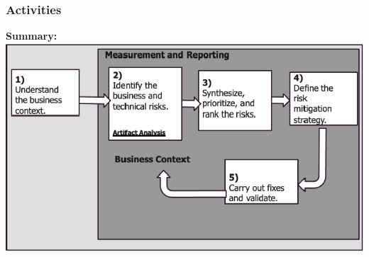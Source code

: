 \subsubsection{Activities}
\textbf{Summary:}\\
\includegraphics[width=\linewidth]{../img/risk_management_activities.png}
